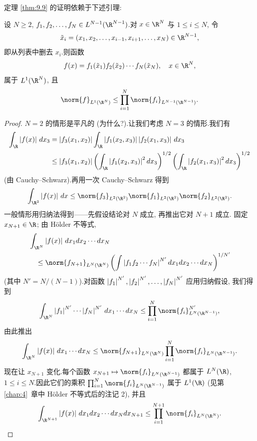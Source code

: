 定理  \ref{thm:9.9} 的证明依赖于下述引理:

\begin{lemma}
\label{lem:9.4}
设 $N\ge2$, $f_1,f_2,\dots,f_N\in L^{N-1}(\R^{N-1})$.对 $x\in\R^N$ 与
$1\le i\le N$, 令
\begin{equation*}
\tilde x_i=(x_1,x_2,\dots,x_{i-1},x_{i+1},\dots,x_N)\in\R^{N-1},
\end{equation*}
即从列表中删去 $x_i$.则函数
\begin{equation*}
f(x)=f_1(\tilde x_1)f_2(\tilde x_2)\cdots f_N(\tilde x_N),\quad x\in\R^N,
\end{equation*}
属于 $L^1(\R^N)$, 且
\begin{equation*}
\norm{f}_{L^1(\R^N)}\le\prod_{i=1}^N\norm{f_i}_{L^{N-1}(\R^{N-1})}.
\end{equation*}
\end{lemma}

\begin{proof}
$N=2$ 的情形是平凡的 (为什么?).让我们考虑 $N=3$ 的情形.我们有
\begin{align*}
\int_\R\abs{f(x)}\,dx_3
&=\abs{f_3(x_1,x_2)}\int_\R\abs{f_1(x_2,x_3)}\abs{f_2(x_1,x_3)}\,dx_3\\
&\le\abs{f_3(x_1,x_2)}\left(\int_\R\abs{f_1(x_2,x_3)}^2dx_3\right)^{1/2}
\left(\int_\R\abs{f_2(x_1,x_3)}^2dx_3\right)^{1/2}
\end{align*}
(由 Cauchy--Schwarz).再用一次 Cauchy--Schwarz 得到
\begin{equation*}
\int_{\R^3}\abs{f(x)}\,dx\le\norm{f_3}_{L^2(\R^2)}
\norm{f_1}_{L^2(\R^2)}\norm{f_2}_{L^2(\R^2)}.
\end{equation*}
一般情形用归纳法得到——先假设结论对 $N$ 成立, 再推出它对 $N+1$ 成立.
固定 $x_{N+1}\in\R$; 由 Hölder 不等式,
\begin{align*}
&\int_{\R^N}\abs{f(x)}\,dx_1dx_2\cdots dx_N\\
&\quad\le\norm{f_{N+1}}_{L^N(\R^N)}
\left(\int\abs{f_1f_2\cdots f_N}^{N'}dx_1dx_2\cdots dx_N\right)^{1/N'}
\end{align*}
(其中 $N'=N/(N-1)$).对函数 $\left|f_1\right|^{N'},\left|f_2\right|^{N'},\dots,
\left|f_N\right|^{N'}$ 应用归纳假设, 我们得到
\begin{equation*}
\int_{\R^N}\abs{f_1}^{N'}\cdots\abs{f_N}^{N'}\,dx_1\cdots dx_N
\le\prod_{i=1}^N\norm{f_i}_{L^N(\R^{N-1})}^{N'},
\end{equation*}
由此推出
\begin{equation*}
\int_{\R^N}\abs{f(x)}\,dx_1\cdots dx_N
\le\norm{f_{N+1}}_{L^N(\R^N)}\prod_{i=1}^N
\norm{f_i}_{L^N(\R^{N-1})}.
\end{equation*}
现在让 $x_{N+1}$ 变化.每个函数
$x_{N+1}\mapsto\norm{f_i}_{L^N(\R^{N-1})}$ 都属于 $L^N(\R)$,
$1\le i\le N$.因此它们的乘积
$\prod_{i=1}^N\norm{f_i}_{L^N(\R^{N-1})}$ 属于 $L^1(\R)$ (见第~
\ref{chap:4}~章中
Hölder 不等式后的注记 2), 并且
\begin{equation*}
\int_{\R^{N+1}}\abs{f(x)}\,dx_1dx_2\cdots dx_Ndx_{N+1}
\le\prod_{i=1}^{N+1}\norm{f_i}_{L^N(\R^N)}.
\end{equation*}
\end{proof}

